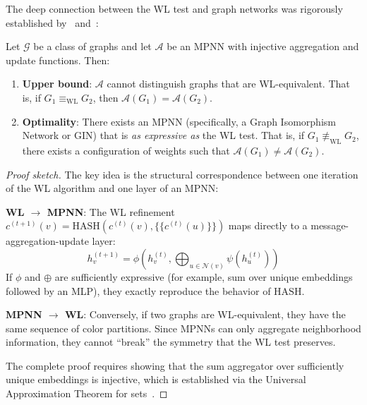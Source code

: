 The deep connection between the WL test and graph networks was rigorously established by~\citet{xu2019how} and~\citet{morris2019weisfeiler}:

\begin{theorem}\label{thm:wl_mpnn_equivalencia}
Let $\mathcal{G}$ be a class of graphs and let $\mathcal{A}$ be an \gls{MPNN} with injective aggregation and update functions. Then:
\begin{enumerate}
    \item \textbf{Upper bound}: $\mathcal{A}$ cannot distinguish graphs that are WL-equivalent. That is, if $G_1 \equiv_{\mathrm{WL}} G_2$, then $\mathcal{A}(G_1) = \mathcal{A}(G_2)$.

    \item \textbf{Optimality}: There exists an \gls{MPNN} (specifically, a Graph Isomorphism Network or GIN) that is \textit{as expressive as} the WL test. That is, if $G_1 \not\equiv_{\mathrm{WL}} G_2$, there exists a configuration of weights such that $\mathcal{A}(G_1) \neq \mathcal{A}(G_2)$.
\end{enumerate}
\end{theorem}

\begin{proof}[Proof sketch]
The key idea is the structural correspondence between one iteration of the WL algorithm and one layer of an \gls{MPNN}:

\textbf{WL $\rightarrow$ MPNN}: The WL refinement $c^{(t+1)}(v) = \mathrm{HASH}(c^{(t)}(v), \{\{c^{(t)}(u)\}\})$ maps directly to a message-aggregation-update layer:
\[
h_v^{(t+1)} = \phi\left(h_v^{(t)}, \bigoplus_{u \in \mathcal{N}(v)} \psi(h_u^{(t)})\right)
\]
If $\phi$ and $\oplus$ are sufficiently expressive (for example, sum over unique embeddings followed by an MLP), they exactly reproduce the behavior of $\mathrm{HASH}$.

\textbf{MPNN $\rightarrow$ WL}: Conversely, if two graphs are WL-equivalent, they have the same sequence of color partitions. Since \glspl{MPNN} can only aggregate neighborhood information, they cannot ``break'' the symmetry that the WL test preserves.

The complete proof requires showing that the sum aggregator over sufficiently unique embeddings is injective, which is established via the Universal Approximation Theorem for sets~\citep{zaheer2017deepsets}.
\end{proof}

